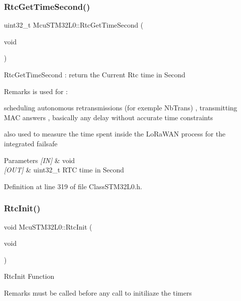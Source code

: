 \subsubsection{\texorpdfstring{Rtc\+Get\+Time\+Second()}{RtcGetTimeSecond()}}
{\footnotesize\ttfamily uint32\+\_\+t Mcu\+S\+T\+M32\+L0\+::\+Rtc\+Get\+Time\+Second (\begin{DoxyParamCaption}\item[{void}]{ }\end{DoxyParamCaption})\hspace{0.3cm}{\ttfamily [inline]}}

Rtc\+Get\+Time\+Second \+: return the Current Rtc time in Second \begin{DoxyRemark}{Remarks}
is used for \+: 

scheduling autonomous retransmissions (for exemple Nb\+Trans) , transmitting M\+AC answers , basically any delay without accurate time constraints 

also used to measure the time spent inside the Lo\+Ra\+W\+AN process for the integrated failsafe 
\end{DoxyRemark}

\begin{DoxyParams}{Parameters}
{\em \mbox{[}\+I\+N\mbox{]}} & void \\
\hline
{\em \mbox{[}\+O\+U\+T\mbox{]}} & uint32\+\_\+t R\+TC time in Second \\
\hline
\end{DoxyParams}


Definition at line 319 of file Class\+S\+T\+M32\+L0.\+h.

\mbox{\label{class_mcu_s_t_m32_l0_a58bee4a52ad012eab7691a747f6e1ded}} 
\subsubsection{\texorpdfstring{Rtc\+Init()}{RtcInit()}}
{\footnotesize\ttfamily void Mcu\+S\+T\+M32\+L0\+::\+Rtc\+Init (\begin{DoxyParamCaption}\item[{void}]{ }\end{DoxyParamCaption})\hspace{0.3cm}{\ttfamily [inline]}}

Rtc\+Init Function \begin{DoxyRemark}{Remarks}
must be called before any call to initiliaze the timers 
\end{DoxyRemark}

